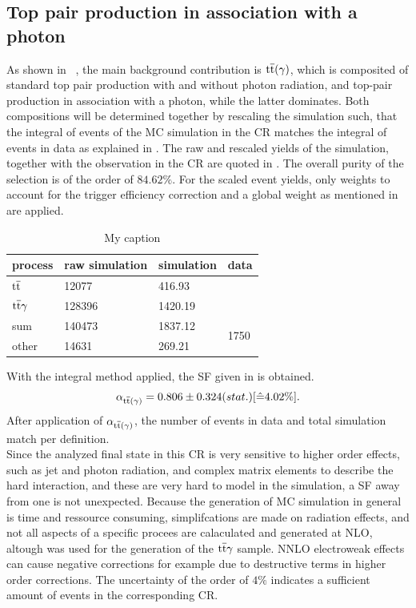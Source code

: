 \subsection{Top pair production in association with a photon}\label{sec:ttbar}
As shown in ~, the main background contribution is ${\mathrm{t}\overline{\mathrm{t}}}(\gamma)$, which is composited of standard top pair production with and without photon radiation, and top-pair production in association with a photon, while the latter dominates. Both compositions will be determined together by rescaling the simulation such, that the integral of events of the MC simulation in the CR matches the integral of events in data as explained in . The raw and rescaled yields of the simulation, together with the observation in the CR are quoted in . The overall purity of the selection is of the order of $84.62\%$. For the scaled event yields, only weights to account for the trigger efficiency correction and a global weight as mentioned in  are applied.
\begin{table}[htb]
 \centering
 \caption{My caption}
 \label{tab:CRTT}
 \begin{tabular}{llll}
  
  process      & raw simulation & simulation & data                  \\\hline
  ${\mathrm{t}\overline{\mathrm{t}}}$     & 12077          & 416.93     &                       \\
  ${\mathrm{t}\overline{\mathrm{t}}}\gamma$ & 128396         & 1420.19    &                       \\\hline\hline
  sum          & 140473         & 1837.12    & \multirow{2}{*}{1750} \\
  other        & 14631          & 269.21     &                       
 \end{tabular}
\end{table}
With the integral method applied, the SF given in  is obtained.
\begin{equation}\label{eq:AlphaTT}
 \alpha_{{\mathrm{t}\overline{\mathrm{t}}}(\gamma)}=0.806 \pm 0.324 (stat.) [\hat{=}4.02\%].
\end{equation}
After application of $\alpha_{{\mathrm{t}\overline{\mathrm{t}}}(\gamma)}$, the number of events in data and total simulation match per definition.\\
Since the analyzed final state in this CR is very sensitive to higher order effects, such as jet and photon radiation, and complex matrix elements to describe the hard interaction, and these are very hard to model in the simulation, a SF away from one is not unexpected. Because the generation of MC simulation in general is time and ressource consuming, simplifcations are made on \eg radiation effects, and not all aspects of a specific procees are calaculated and generated at NLO, altough \AMCATNLO was used for the generation of the ${\mathrm{t}\overline{\mathrm{t}}}\gamma$ sample. NNLO electroweak effects can cause negative corrections for example due to destructive terms in higher order corrections. The uncertainty of the order of $4\%$ indicates a sufficient amount of events in the corresponding CR.\\
